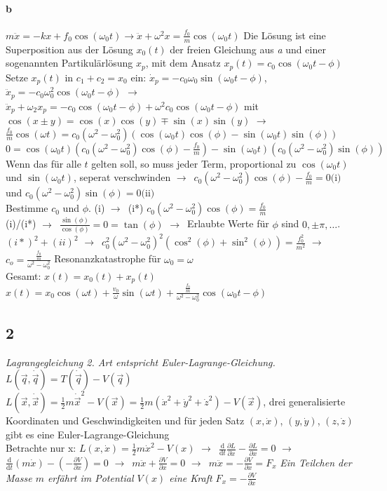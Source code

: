 \documentclass[oneside]{book}
\theoremstyle{definition}
\newcommand{\conseq}{$\rightarrow$~}
\renewcommand{\d}{\mathrm d}
\newcommand{\dd}[1]{\frac{\d}{\d #1}}
\newcommand{\ffpartial}[2]{\frac{\partial #1}{\partial #2}}
\newcommand{\dotvec}[1]{\dot{\vec{#1}}}
\begin{document}
\paragraph{b}
$m \ddot{x} = -kx + f_0 \cos(\omega_0 t) \rightarrow \ddot{x} + \omega^2 x = \frac{f_0}{m} \cos(\omega_0 t)$
	Die Lösung ist eine Superposition aus der Lösung $x_0(t)$ der freien Gleichung aus \textit{a} und einer sogenannten Partikulärlösung $x_p$, mit dem Ansatz $x_p(t) = c_0 \cos(\omega_0 t - \phi)$
	\\Setze $x_p(t)$ in  $c_1 + c_2 = x_0$ ein: $\dot{x}_p = - c_0 \omega_0 \sin(\omega_0 t - \phi)$, $\ddot{x}_p = - c_0 \omega_0^2 \cos(\omega_0 t - \phi)$
	\conseq $\ddot{x}_p + \omega_2 x_p = - c_0 \cos(\omega_0 t - \phi) + \omega^2 c_0 \cos(\omega_0 t - \phi)$
	mit $\cos(x \pm y) = \cos(x)\cos(y) \mp \sin(x)\sin(y)$
	\conseq $\frac{f_0}{m} \cos(\omega t) = c_0 (\omega^2 - \omega_0^2) (\cos(\omega_0 t) \cos(\phi) - \sin(\omega_0 t)\sin(\phi))$
	$0 = \cos(\omega_0 t)(c_0 (\omega^2 - \omega_0^2)\cos(\phi) - \frac{f_0}{m}) - \sin(\omega_0 t)(c_0 (\omega^2 - \omega_0^2) \sin(\phi))$
	\\ Wenn das für alle $t$ gelten soll, so muss jeder Term, proportional zu $\cos(\omega_0 t)$ und $\sin(\omega_0 t)$, seperat verschwinden \conseq $c_0 (\omega^2 - \omega_0^2) \cos(\phi) - \frac{f_0}{m} = 0 \text{(i)}$ und $c_0 (\omega^2 - \omega_0^2) \sin(\phi) = 0 \text{(ii)}$\\
	Bestimme $c_0$ und $\phi$.
	(i) \conseq (i*) $c_0 (\omega^2 - \omega_0^2) \cos(\phi) = \frac{f_0}{m}$\\
	(i)/(i*) \conseq $\frac{\sin(\phi)}{\cos(\phi)} = 0 = \tan (\phi)$
	\conseq Erlaubte Werte für $\phi$ sind $0, \pm \pi, \dots$.\\
	$(i*)^2 + (ii)^2$ \conseq $c_0^2 (\omega^2 - \omega_0^2)^2 (\cos^2(\phi) + \sin^2(\phi)) = \frac{f_0^2}{m^2}$ \conseq $c_o = \frac{\frac{f_0}{m}}{\omega^2 - \omega_0^2}$ Resonanzkatastrophe für $\omega_0 = \omega$\\
Gesamt: $x(t) = x_0(t) + x_p(t)$\\
$x(t) = x_0 \cos(\omega t) + \frac{v_0}{\omega} \sin(\omega t) + \frac{\frac{f_0}{m}}{\omega^2 - \omega_0^2} \cos (\omega_0 t - \phi)$

\subsection{2}
\textit{Lagrangegleichung 2. Art entspricht Euler-Lagrange-Gleichung.}
$L(\vec q, \dotvec{q}) = T(\dotvec{q}) - V(\vec{q})$\\
$L(\vec{x}, \dotvec{x}) = \frac12 m \dotvec{x}^2 - V(\vec{x}) = \frac12 m (\dot{x}^2 + \dot{y}^2 + \dot{z}^2) - V(\vec{x})$, drei generalisierte Koordinaten und Geschwindigkeiten und für jeden Satz $(x, \dot x)$, $(y, \dot y)$, $(z, \dot z)$ gibt es eine Euler-Lagrange-Gleichung\\
Betrachte nur x: $L(x, \dot x) = \frac12 m \dot{x}^2 - V(x)$
\conseq $\dd t \ffpartial{L}{\dot{x}} - \ffpartial{L}{x} = 0$ \conseq $\dd t (m \dot x) - (- \ffpartial{V}{x}) = 0$ \conseq $m \ddot x + \ffpartial{V}{x} = 0$ \conseq $m \ddot x = - \ffpartial{V}{x} = F_x$ \textit{Ein Teilchen der Masse $m$ erfährt im Potential $V(x)$ eine Kraft $F_x = -\ffpartial{V}{x}$}
\end{document}
